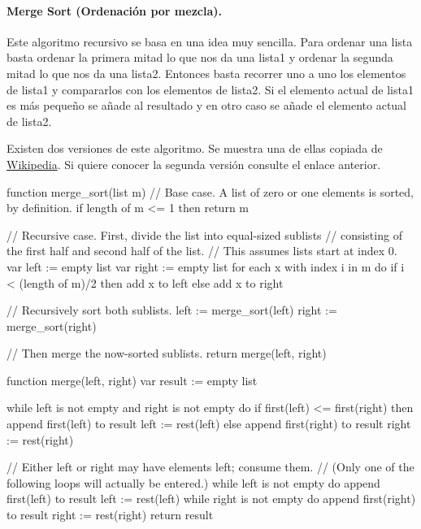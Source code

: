 \paragraph{Merge Sort (Ordenación por mezcla).}  \label{sec:mergeSort}
Este algoritmo recursivo se basa en una idea muy sencilla. Para ordenar una lista basta ordenar la primera mitad lo que nos da una lista1 y ordenar la segunda mitad lo que nos da una lista2.
Entonces basta recorrer uno a uno los elementos de lista1 y compararlos con los elementos de lista2. Si el elemento actual de lista1 es más pequeño se añade al resultado y en otro caso se añade el elemento actual de lista2.

Existen dos versiones de este algoritmo. Se muestra una de ellas copiada de \href{https://en.wikipedia.org/wiki/Merge_sort#:~:text=In\%20computer\%20science\%2C\%20merge\%20sort,in\%20the\%20input\%20and\%20output.}{Wikipedia}. Si quiere conocer la segunda versión consulte el enlace anterior.

\begin{pyverbatim}[][frame=single]
function merge_sort(list m)
    // Base case. A list of zero or one elements is sorted, by definition.
    if length of m <= 1 then
        return m

    // Recursive case. First, divide the list into equal-sized sublists
    // consisting of the first half and second half of the list.
    // This assumes lists start at index 0.
    var left := empty list
    var right := empty list
    for each x with index i in m do
        if i < (length of m)/2 then
            add x to left
        else
            add x to right

    // Recursively sort both sublists.
    left := merge_sort(left)
    right := merge_sort(right)

    // Then merge the now-sorted sublists.
    return merge(left, right)
\end{pyverbatim}

\begin{pyverbatim}[][frame=single]
function merge(left, right)
    var result := empty list

    while left is not empty and right is not empty do
        if first(left) <= first(right) then
            append first(left) to result
            left := rest(left)
        else
            append first(right) to result
            right := rest(right)

    // Either left or right may have elements left; consume them.
    // (Only one of the following loops will actually be entered.)
    while left is not empty do
        append first(left) to result
        left := rest(left)
    while right is not empty do
        append first(right) to result
        right := rest(right)
    return result
\end{pyverbatim}


